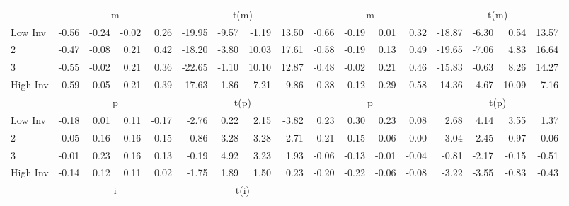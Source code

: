 \begin{table}[!ht]
\begin{tabular}{lrrrrrrrrrrrrrrrr}
  
    
      & \multicolumn{4}{c}{m} & \multicolumn{4}{c}{t(m)}
    
      & \multicolumn{4}{c}{m} & \multicolumn{4}{c}{t(m)}
    
    \\
      \cmidrule(r){2-5} \cmidrule(r){6-9} \cmidrule(r){10-13} \cmidrule(r){14-17}

    Low Inv   & -0.56  & -0.24  & -0.02  & 0.26  & -19.95  & -9.57  & -1.19  & 13.50  & -0.66  & -0.19  & 0.01  & 0.32  & -18.87  & -6.30  & 0.54  & 13.57  \\
           2  & -0.47  & -0.08  & 0.21  & 0.42  & -18.20  & -3.80  & 10.03  & 17.61  & -0.58  & -0.19  & 0.13  & 0.49  & -19.65  & -7.06  & 4.83  & 16.64  \\
           3  & -0.55  & -0.02  & 0.21  & 0.36  & -22.65  & -1.10  & 10.10  & 12.87  & -0.48  & -0.02  & 0.21  & 0.46  & -15.83  & -0.63  & 8.26  & 14.27  \\
    High Inv  & -0.59  & -0.05  & 0.21  & 0.39  & -17.63  & -1.86  & 7.21  & 9.86  & -0.38  & 0.12  & 0.29  & 0.58  & -14.36  & 4.67  & 10.09  & 7.16  \\

  
    
      & \multicolumn{4}{c}{p} & \multicolumn{4}{c}{t(p)}
    
      & \multicolumn{4}{c}{p} & \multicolumn{4}{c}{t(p)}
    
    \\
      \cmidrule(r){2-5} \cmidrule(r){6-9} \cmidrule(r){10-13} \cmidrule(r){14-17}

    Low Inv   & -0.18  & 0.01  & 0.11  & -0.17  & -2.76  & 0.22  & 2.15  & -3.82  & 0.23  & 0.30  & 0.23  & 0.08  & 2.68  & 4.14  & 3.55  & 1.37  \\
           2  & -0.05  & 0.16  & 0.16  & 0.15  & -0.86  & 3.28  & 3.28  & 2.71  & 0.21  & 0.15  & 0.06  & 0.00  & 3.04  & 2.45  & 0.97  & 0.06  \\
           3  & -0.01  & 0.23  & 0.16  & 0.13  & -0.19  & 4.92  & 3.23  & 1.93  & -0.06  & -0.13  & -0.01  & -0.04  & -0.81  & -2.17  & -0.15  & -0.51  \\
    High Inv  & -0.14  & 0.12  & 0.11  & 0.02  & -1.75  & 1.89  & 1.50  & 0.23  & -0.20  & -0.22  & -0.06  & -0.08  & -3.22  & -3.55  & -0.83  & -0.43  \\

  
    
      & \multicolumn{4}{c}{i} & \multicolumn{4}{c}{t(i)}
    

\end{tabular}
\end{table}
